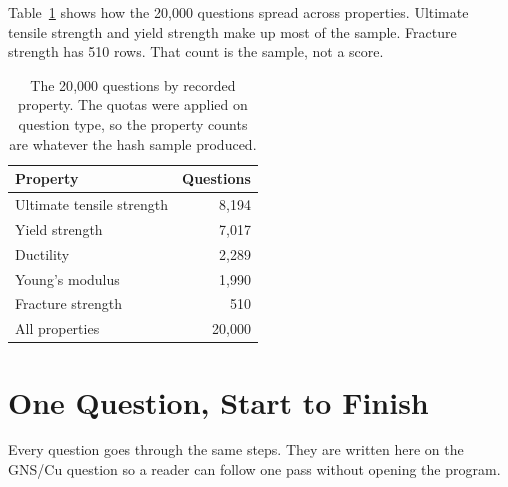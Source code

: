 \documentclass[conference]{IEEEtran}
\begin{document}
Table~\ref{tab:sample} shows how the 20{,}000 questions spread across properties. Ultimate tensile strength and yield strength make up most of the sample. Fracture strength has 510 rows. That count is the sample, not a score.

\begin{table}[t]
\caption{The 20{,}000 questions by recorded property. The quotas were applied on question type, so the property counts are whatever the hash sample produced.}
\label{tab:sample}
\centering
\begin{tabular}{lr}
\toprule
Property & Questions \\
\midrule
Ultimate tensile strength & 8{,}194 \\
Yield strength & 7{,}017 \\
Ductility & 2{,}289 \\
Young's modulus & 1{,}990 \\
Fracture strength & 510 \\
\midrule
All properties & 20{,}000 \\
\bottomrule
\end{tabular}
\end{table}

\section{One Question, Start to Finish}
Every question goes through the same steps. They are written here on the GNS/Cu question so a reader can follow one pass without opening the program.
\end{document}
